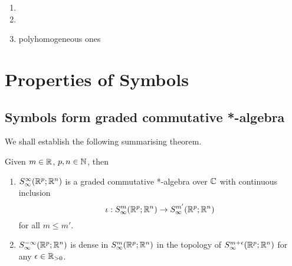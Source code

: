 \documentclass[12pt]{article}
\begin{document}
\begin{example}
    \begin{enumerate}
        \item {}
        \item {}
        \item polyhomogeneous ones
    \end{enumerate}
\end{example}



\section{Properties of Symbols}

\subsection{Symbols form graded commutative *-algebra} 
We shall establish the following summarising theorem. 
\begin{ftheorem}[Summary]
    Given $m \in {\ensuremath {\mathbb R}}$, $p, n \in {\ensuremath {\mathbb N}}$, then
    \begin{enumerate}
        \item $S^{\infty}_\infty({\mathbb R}^{p}; {\mathbb R}^n)$ is a graded commutative *-algebra over ${\mathbb C}$ with continuous  inclusion  $$\iota : S^{m}_\infty({\mathbb R}^p; {\mathbb R}^n) \to S^{m'}_\infty({\mathbb R}^p; {\mathbb R}^n)$$ for all $m \leq m'$. 
        \item $S^{-\infty}_\infty({\mathbb R}^{p}; {\mathbb R}^n)$ is dense in $S^{m}_\infty({\mathbb R}^{p}; {\mathbb R}^n)$ in the topology of $S^{m + \epsilon}_\infty({\mathbb R}^{p}; {\mathbb R}^n)$ for any $\epsilon \in {\ensuremath {\mathbb R}}_{> 0}$. 
    \end{enumerate}
    
\end{ftheorem}


\end{document}
